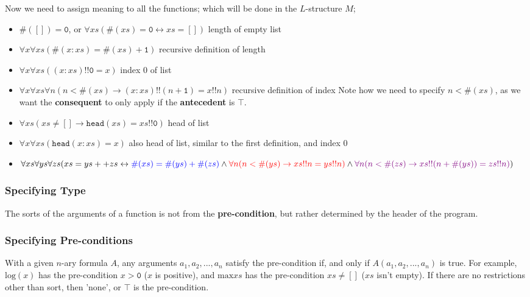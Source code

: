 \documentclass[a4paper, 12pt]{article}
\begin{document}
                Now we need to assign meaning to all the functions; which will be done in the $L$-structure $M$;
                \begin{itemize}
                    \item $\#([]) = \texttt{0}$, or $\forall xs (\#(xs) = \texttt{0} \leftrightarrow xs = [])$ \hfill length of empty list
                    \item $\forall x \forall xs (\#(x : xs) = \#(xs) + \texttt{1})$ \hfill recursive definition of length
                    \item $\forall x \forall xs ((x : xs) !! \texttt{0} = x)$ \hfill index 0 of list
                    \item $\forall x \forall xs \forall n (n < \#(xs) \rightarrow (x : xs) !! (n + \texttt{1}) = x !! n)$ \hfill recursive definition of index
                        \subitem Note how we need to specify $n < \#(xs)$, as we want the \textbf{consequent} to only apply if the \textbf{antecedent} is $\top$.
                    \item $\forall xs (xs \neq [] \rightarrow \texttt{head}(xs) = xs !! \texttt{0})$ \hfill head of list
                    \item $\forall x \forall xs (\texttt{head}(x : xs) = x)$ \hfill also head of list, similar to the first definition, and index 0
                    \item $\forall xs \forall ys \forall zs (xs = ys ++ zs \leftrightarrow \\ \textcolor{blue}{\#(xs) = \#(ys) + \#(zs)} \land \\ \textcolor{red}{\forall n (n < \#(ys) \rightarrow xs !! n = ys !! n)} \land \\ \textcolor{violet}{\forall n (n < \#(zs) \rightarrow xs !! (n + \#(ys)) = zs !! n)})$
                \end{itemize}
            \subsubsection*{Specifying Type}
                The sorts of the arguments of a function is not from the \textbf{pre-condition}, but rather determined by the header of the program.
            \subsubsection*{Specifying Pre-conditions}
                With a given $n$-ary formula $A$, any arguments $a_1, a_2, ..., a_n$ satisfy the pre-condition if, and only if $A(a_1, a_2, ..., a_n)$ is true. For example, $\text{log}(x)$ has the pre-condition $x > \texttt{0}$ ($x$ is positive), and $\text{max} xs$ has the pre-condition $xs \neq []$ ($xs$ isn't empty). If there are no restrictions other than sort, then 'none', or $\top$ is the pre-condition.
\end{document}
